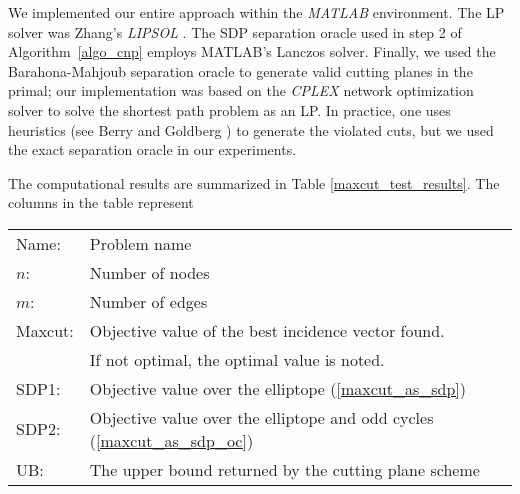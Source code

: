 \documentclass[12pt]{article}
\begin{document}
We implemented our entire approach within the {\em MATLAB}
environment. The LP solver was Zhang's {\em LIPSOL} \cite{zhang8}.
The SDP separation oracle used in step 2 of Algorithm~\ref{algo_cnp} employs MATLAB's Lanczos
solver. Finally, we used the Barahona-Mahjoub separation oracle to
generate valid cutting planes in the primal; our implementation
was based on the {\em CPLEX} \cite{cplex1} network optimization
solver to solve the shortest path problem as an LP. In practice,
one uses heuristics (see Berry and Goldberg \cite{berry_goldberg})
to generate the violated cuts, but we used the exact separation
oracle in our experiments.

The computational results are summarized in Table
\ref{maxcut_test_results}. The columns in the table represent
\begin{center}
\begin{tabular}{ll}
Name: &Problem name
\\  $n$: & Number of nodes
\\  $m$: & Number of edges
\\  Maxcut: & Objective value of the best incidence vector found.  \\
& If not optimal, the optimal value is noted.
\\  SDP1: & Objective value over the elliptope (\ref{maxcut_as_sdp})
\\  SDP2: & Objective value over the elliptope and odd cycles (\ref{maxcut_as_sdp_oc})
\\  UB: & The upper bound returned by the cutting plane scheme
\end{tabular}
\end{center}
\end{document}
